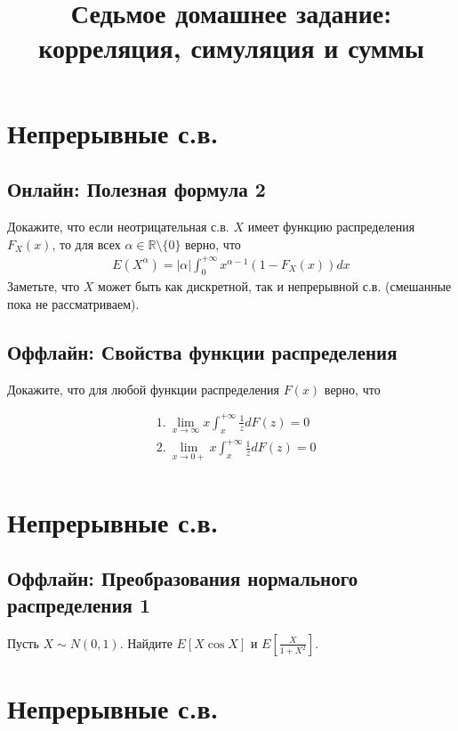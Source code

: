 \documentclass[12pt]{article}
\title{Седьмое домашнее задание: корреляция, симуляция и суммы}
\newcommand\R{\mathbb{R}}
\begin{document}
\maketitle

\setcounter{section}{3}
\section{Непрерывные с.в.}

\setcounter{subsection}{4}
\subsection{Онлайн: Полезная формула 2}

Докажите, что если неотрицательная с.в. $X$ имеет функцию распределения $F_X(x)$, то для всех $\alpha \in \R \setminus \{0\}$ верно, что
\begin{align*}
    E(X^\alpha) = |\alpha| \int_0^{+\infty} x^{\alpha - 1}\left(1 - F_X(x)\right)dx
\end{align*}
Заметьте, что $X$ может быть как дискретной, так и непрерывной с.в. (смешанные пока не рассматриваем).

\setcounter{subsection}{7}
\subsection{Оффлайн: Свойства функции распределения}

Докажите, что для любой функции распределения $F(x)$ верно, что

\begin{align*}
    &1.\ \lim_{x \to \infty} x\int_x^{+\infty} \frac{1}{z} d F(z) = 0 \\
    &2.\ \lim_{x \to 0+} x\int_x^{+\infty} \frac{1}{z} d F(z) = 0 \\
\end{align*}

\section{Непрерывные с.в.}
\setcounter{subsection}{3}
\subsection{Оффлайн: Преобразования нормального распределения 1}

Пусть $X \sim N(0, 1)$. Найдите $E[X\cos X]$ и $E[\frac{X}{1 + X^2}]$.


\section{Непрерывные с.в.}
\setcounter{subsection}{3}
\end{document}
